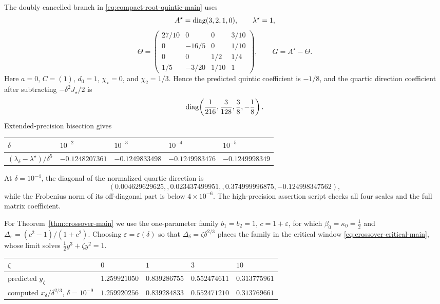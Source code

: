 The doubly cancelled branch in
\eqref{eq:compact-root-quintic-main} uses
\[
 A^\star=\operatorname{diag}(3,2,1,0),\qquad \lambda^\star=1,
\]
\[
 \Theta=\begin{pmatrix}
  27/10&0&0&3/10\\
  0&-16/5&0&1/10\\
  0&0&1/2&1/4\\
  1/5&-3/20&1/10&1
 \end{pmatrix},\qquad G=A^\star-\Theta.
\]
Here \(a=0\), \(C=(1)\), \(d_0=1\),
\(\chi_\star=0\), and \(\chi_2=1/3\).  Hence the predicted quintic
coefficient is \(-1/8\), and the quartic direction coefficient after
subtracting \(-\delta^2J_\star/2\) is
\[
 \operatorname{diag}\!\left(\frac1{216},\frac3{128},\frac38,-\frac18\right).
\]
Extended-precision bisection gives
\begin{center}
\begin{tabular}{@{}lllll@{}}
\toprule
\(\delta\) & \(10^{-2}\) & \(10^{-3}\) & \(10^{-4}\) & \(10^{-5}\)\\
\midrule
\((\lambda_\delta-\lambda^\star)/\delta^5\) &
\(-0.1248207361\)&\(-0.1249833498\)&\(-0.1249983476\)&\(-0.1249998349\)\\
\bottomrule
\end{tabular}
\end{center}
At \(\delta=10^{-4}\), the diagonal of the normalized quartic direction is
\[
 (0.004629629625,,0.023437499951,,0.374999996875,
   -0.124998347562),
\]
while the Frobenius norm of its off-diagonal part is below
\(4\times10^{-6}\).  The high-precision assertion script checks all four
scales and the full matrix coefficient.

For Theorem~\ref{thm:crossover-main} we use the one-parameter family
\(b_1=b_2=1\), \(c=1+\varepsilon\), for which
\(\beta_0=\kappa_0=\tfrac12\) and
\(\Delta_\varepsilon=(c^2-1)/(1+c^2)\).  Choosing \(\varepsilon=
\varepsilon(\delta)\) so that \(\Delta_\delta=\zeta\delta^{2/3}\) places the
family in the critical window \eqref{eq:crossover-critical-main}, whose
limit solves \(\tfrac12y^3+\zeta y^2=1\).

\begin{center}
\begin{tabular}{@{}lllll@{}}
\toprule
\(\zeta\) & \(0\) & \(1\) & \(3\) & \(10\)\\
\midrule
predicted \(y_\zeta\) &
\(1.259921050\)&\(0.839286755\)&\(0.552474611\)&\(0.313775961\)\\
computed \(x_\delta/\delta^{2/3}\), \(\delta=10^{-9}\) &
\(1.259920256\)&\(0.839284833\)&\(0.552471210\)&\(0.313769661\)\\
\bottomrule
\end{tabular}
\end{center}

